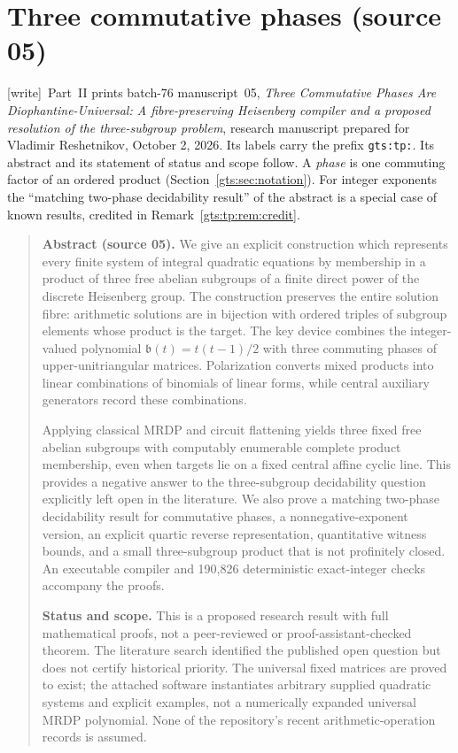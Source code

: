 \documentclass[11pt,letterpaper]{article}
\theoremstyle{definition}
\theoremstyle{remark}
\newcommand{\bn}{\mathfrak b}
\newcommand{\wtag}{\textup{[write]}}
\begin{document}
\part{Three commutative phases (source 05)}\label{gts:part:tp}

\noindent\wtag\ Part~II prints batch-76 manuscript~05, \emph{Three Commutative Phases Are Diophantine-Universal: A fibre-preserving Heisenberg compiler and a proposed resolution of the three-subgroup problem}, research manuscript prepared for Vladimir Reshetnikov, October 2, 2026. Its labels carry the prefix \texttt{gts:tp:}. Its abstract and its statement of status and scope follow. A \emph{phase} is one commuting factor of an ordered product (Section~\ref{gts:sec:notation}). For integer exponents the ``matching two-phase decidability result'' of the abstract is a special case of known results, credited in Remark~\ref{gts:tp:rem:credit}.

\begin{quote}\small
\textbf{Abstract (source 05).} We give an explicit construction which represents every finite system of
integral quadratic equations by membership in a product of three free abelian
subgroups of a finite direct power of the discrete Heisenberg group. The
construction preserves the entire solution fibre: arithmetic solutions are in
bijection with ordered triples of subgroup elements whose product is the
target. The key device combines the integer-valued polynomial
$\bn(t)=t(t-1)/2$ with three commuting phases of upper-unitriangular matrices.
Polarization converts mixed products into linear combinations of binomials of
linear forms, while central auxiliary generators record these combinations.

Applying classical MRDP and circuit flattening yields three fixed free
abelian subgroups with computably enumerable complete product membership,
even when targets lie on a fixed central affine cyclic line. This provides a
negative answer to the three-subgroup decidability question explicitly left
open in the literature. We also prove a matching two-phase decidability
result for commutative phases, a nonnegative-exponent version, an explicit
quartic reverse representation, quantitative witness bounds, and a small
three-subgroup product that is not profinitely closed. An executable compiler
and 190,826 deterministic exact-integer checks accompany the proofs.

\medskip
\noindent\textbf{Status and scope.}
This is a proposed research result with full mathematical proofs, not a
peer-reviewed or proof-assistant-checked theorem. The literature search
identified the published open question but does not certify historical
priority. The universal fixed matrices are proved to exist; the attached
software instantiates arbitrary supplied quadratic systems and explicit
examples, not a numerically expanded universal MRDP polynomial. None of the
repository's recent arithmetic-operation records is assumed.
\end{quote}
\end{document}
